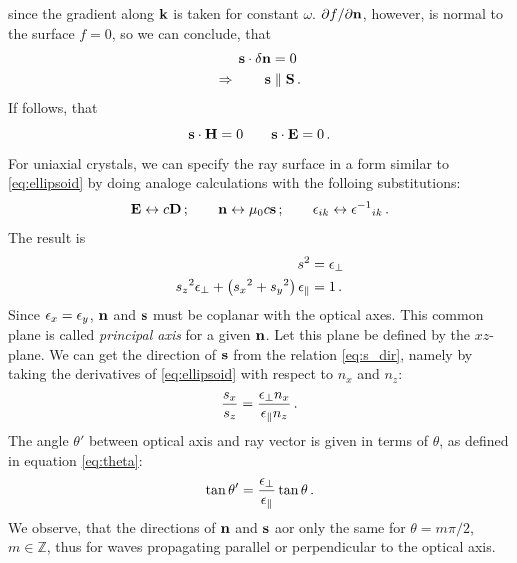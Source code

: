 since the gradient along $\mathbf{k}$ is taken for constant $\omega$. $\partial f / \partial \mathbf{n}$, however, 
is normal to the surface $f = 0$, so we can conclude, that
\begin{align}
    \mathbf{s} \cdot \delta \mathbf{n} &= 0 \\
    \Rightarrow \qquad \mathbf{s} &\parallel \mathbf{S} \, .
\end{align}
If follows, that 
\begin{equation}
    \mathbf{s} \cdot \mathbf{H} = 0 \qquad \mathbf{s} \cdot \mathbf{E} = 0 \, .
    \label{eq:coplanar}
\end{equation}
For uniaxial crystals, we can specify the ray surface in a form similar to 
\eqref{eq:ellipsoid} by doing analoge calculations with the folloing substitutions:
\begin{equation}
    \mathbf{E} \leftrightarrow c \mathbf{D} \, ; 
    \qquad \mathbf{n} \leftrightarrow \mu_0 c \mathbf{s} \, ; 
    \qquad \epsilon_{ik} \leftrightarrow {\epsilon^{-1}}_{ik} \, .
\end{equation}
The result is 
\begin{align}
    s^2 &= \epsilon_\perp
    \label{eq:s_sphere} \\
    {s_z}^2 \epsilon_\perp + \left( {s_x}^2 + 
        {s_y}^2\right) \epsilon_\parallel &= 1 \, .
    \label{eq:s_ellipsoid}
\end{align}
Since $\epsilon_x = \epsilon_y$, $\mathbf{n}$ and $\mathbf{s}$ must be coplanar with the optical axes. This 
common plane is called \emph{principal axis} for a given $\mathbf{n}$. Let this plane be 
defined by the $xz$-plane. We can get the direction 
of $\mathbf{s}$ from the relation \eqref{eq:s_dir}, namely by taking the derivatives of 
\eqref{eq:ellipsoid} with respect to $n_x$ and $n_z$:
\begin{equation}
    \frac{s_x}{s_z} = \frac{\epsilon_\perp n_x}{\epsilon_\parallel n_z} \, .
\end{equation}
The angle $\theta'$ between optical axis and ray vector is given in terms of 
$\theta$, as defined in equation \eqref{eq:theta}:
\begin{equation}
    \tan \theta' = \frac{\epsilon_\perp}{\epsilon_\parallel} \tan \theta\, .
\end{equation}
We observe, that the directions of $\mathbf{n}$ and $\mathbf{s}$ aor only the same for 
$\theta = m \pi / 2$, $m \in \mathbb{Z}$, 
thus for waves propagating parallel or perpendicular to the optical axis. 


